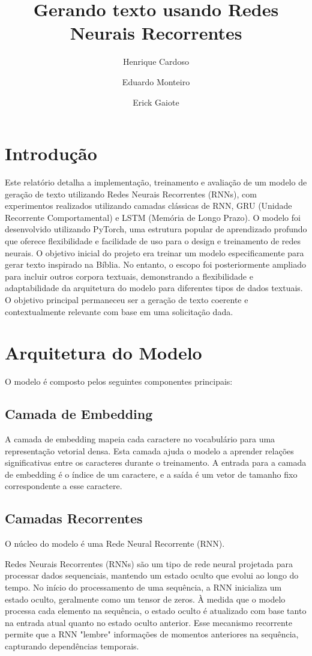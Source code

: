 \documentclass[a4paper,12pt]{article}
\title{Gerando texto usando Redes Neurais Recorrentes}
\author{
    Henrique Cardoso\\
    \and 
    Eduardo Monteiro\\
    \and 
    Erick Gaiote\\
    }
\date{}
\begin{document}
\maketitle

\tableofcontents
\newpage

\section{Introdução}
Este relatório detalha a implementação, treinamento e avaliação de um modelo de geração de texto utilizando Redes Neurais Recorrentes (RNNs), com experimentos realizados utilizando camadas clássicas de RNN, GRU (Unidade Recorrente Comportamental) e LSTM (Memória de Longo Prazo). O modelo foi desenvolvido utilizando PyTorch, uma estrutura popular de aprendizado profundo que oferece flexibilidade e facilidade de uso para o design e treinamento de redes neurais. O objetivo inicial do projeto era treinar um modelo especificamente para gerar texto inspirado na Bíblia. No entanto, o escopo foi posteriormente ampliado para incluir outros corpora textuais, demonstrando a flexibilidade e adaptabilidade da arquitetura do modelo para diferentes tipos de dados textuais. O objetivo principal permaneceu ser a geração de texto coerente e contextualmente relevante com base em uma solicitação dada.

\section{Arquitetura do Modelo} O modelo é composto pelos seguintes componentes principais:

\subsection{Camada de Embedding} A camada de embedding mapeia cada caractere no vocabulário para uma representação vetorial densa. Esta camada ajuda o modelo a aprender relações significativas entre os caracteres durante o treinamento. A entrada para a camada de embedding é o índice de um caractere, e a saída é um vetor de tamanho fixo correspondente a esse caractere.

\subsection{Camadas Recorrentes}
O núcleo do modelo é uma Rede Neural Recorrente (RNN).

Redes Neurais Recorrentes (RNNs) são um tipo de rede neural projetada para processar dados sequenciais, mantendo um estado oculto que evolui ao longo do tempo. No início do processamento de uma sequência, a RNN inicializa um estado oculto, geralmente como um tensor de zeros. À medida que o modelo processa cada elemento na sequência, o estado oculto é atualizado com base tanto na entrada atual quanto no estado oculto anterior. Esse mecanismo recorrente permite que a RNN "lembre" informações de momentos anteriores na sequência, capturando dependências temporais.
\end{document}
